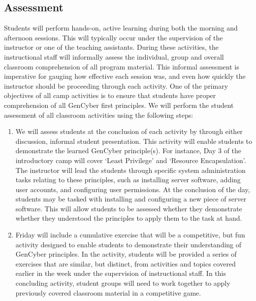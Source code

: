\documentclass[12pt]{article}
\begin{document}
\subsection{Assessment}

Students will perform hands-on, active learning during both the morning and afternoon sessions. This will typically occur under the supervision of the instructor or one of the teaching assistants. During these activities, the instructional staff will informally assess the individual, group and overall classroom comprehension of all program material. This informal assessment is imperative for gauging how effective each session was, and even how quickly the instructor should be proceeding through each activity. One of the primary objectives of all camp activities is to ensure that students have proper comprehension of all GenCyber first principles. We will perform the student assessment of all classroom activities using the following steps:



	\begin{enumerate}[noitemsep]
		\item We will assess students at the conclusion of each activity by through either discussion, informal student presentation. This activity will enable students to demonstrate the learned GenCyber principle(s). For instance, Day 3 of the introductory camp will cover `Least Privilege' and `Resource Encapsulation'. The instructor will lead the students through specific system administration tasks relating to these principles, such as installing server software, adding user accounts, and configuring user permissions. At the conclusion of the day, students may be tasked with installing and configuring a new piece of server software. This will allow students to be assessed whether they demonstrate   whether they understood the principles to apply them to the task at hand.
		\item Friday will include a cumulative exercise that will be a competitive, but fun activity designed to enable students to demonstrate their understanding of GenCyber principles. In the activity, students will be provided a series of exercises that are similar, but distinct, from activities and topics covered earlier in the week under the supervision of instructional staff. In this concluding activity, student groups will need to work together to apply previously covered classroom material in a competitive game. %
	\end{enumerate}
\end{document}

